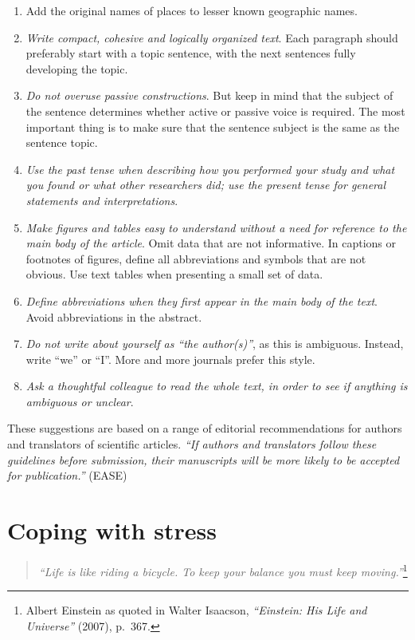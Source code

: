 \documentclass[graybox,envcountchap,sectrefs,UStrade]{svmono}
\begin{document}
\begin{enumerate}
  \item Add the original names of places to lesser known geographic names.
  \item \emph{Write compact, cohesive and logically organized text}. Each paragraph should preferably start with a topic sentence, with the next sentences fully developing the topic.
  \item \emph{Do not overuse passive constructions}. But keep in mind that the subject of the sentence determines whether active or passive voice is required. The most important thing is to make sure that the sentence subject is the same as the sentence topic.
  \item \emph{Use the past tense when describing how you performed your study and what you found or what other researchers did; use the present tense for general statements and interpretations}.
  \item \emph{Make figures and tables easy to understand without a need for reference to the main body of the article}. Omit data that are not informative. In captions or footnotes of figures, define all abbreviations and symbols that are not obvious. Use text tables when presenting a small set of data.
  \item \emph{Define abbreviations when they first appear in the main body of the text}. Avoid abbreviations in the abstract.
  \item \emph{Do not write about yourself as ``the author(s)''}, as this is ambiguous. Instead, write ``we'' or ``I''. More and more journals prefer this style.
  \item \emph{Ask a thoughtful colleague to read the whole text, in order to see if anything is ambiguous or unclear}.
\end{enumerate}

These suggestions are based on a range of editorial recommendations for authors and translators of scientific articles. \emph{``If authors and translators follow these guidelines before submission, their manuscripts will be more likely to be accepted for publication.''} (EASE) \par



\section{Coping with stress}\label{sec:stress}

\begin{quote}
    \emph{``Life is like riding a bicycle. To keep your balance you must keep moving.''}\footnote{Albert Einstein as quoted in Walter Isaacson, \emph{``Einstein: His Life and Universe''} (2007), p.~367.}
\end{quote}
\end{document}
